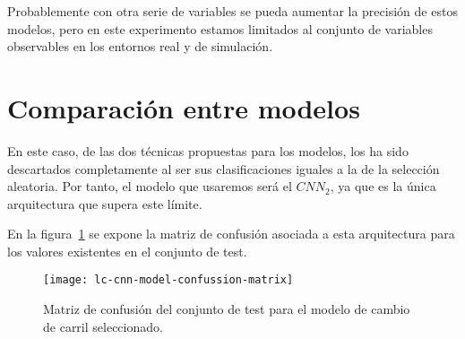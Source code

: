 Probablemente con otra serie de variables se pueda aumentar la precisión de estos modelos, pero en este experimento estamos limitados al conjunto de variables observables en los entornos real y de simulación.

\section{Comparación entre modelos}

En este caso, de las dos técnicas propuestas para los modelos, los  ha sido descartados completamente al ser sus clasificaciones iguales a la de la selección aleatoria. Por tanto, el modelo que usaremos será el $CNN_2$, ya que es la única arquitectura que supera este límite.

En la figura~\ref{fig:lc-cnn-model-confussion-matrix} se expone la matriz de confusión asociada a esta arquitectura para los valores existentes en el conjunto de test.

\begin{figure}
	\centering
	\texttt{[image: lc-cnn-model-confussion-matrix]}
	\caption[Matriz de confusión del conjunto de test para el modelo de cambio de carril seleccionado]{Matriz de confusión del conjunto de test para el modelo de cambio de carril seleccionado.}
	\label{fig:lc-cnn-model-confussion-matrix}
\end{figure}
